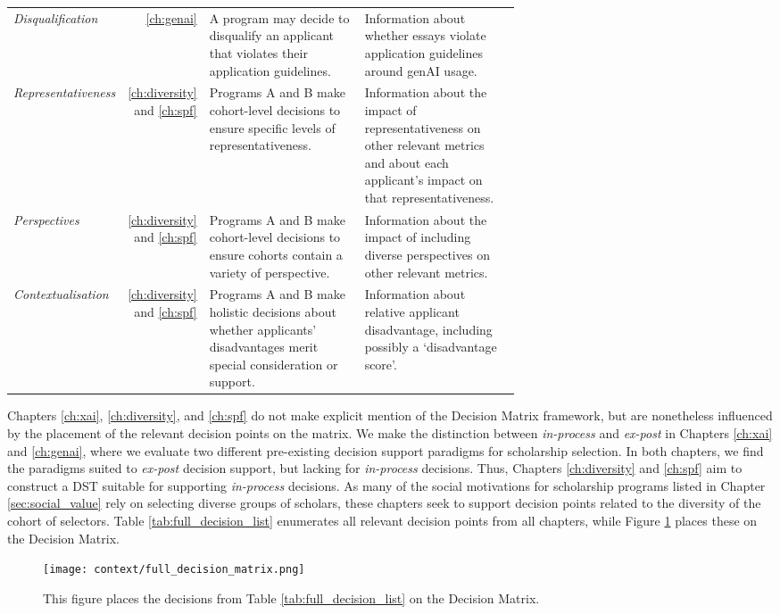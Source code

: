 \begin{table}[htbp]
\begin{tabular}{l r p{0.33\linewidth}p{0.33\linewidth}}
      \emph{Disqualification} & \ref{ch:genai} & A program may decide to disqualify an applicant that violates their application guidelines. & Information about whether essays violate application guidelines around genAI usage. \\
      \emph{Representativeness} & \ref{ch:diversity} and \ref{ch:spf} & Programs A and B make cohort-level decisions to ensure specific levels of representativeness. & Information about the impact of representativeness on other relevant metrics and about each applicant's impact on that representativeness. \\
      \emph{Perspectives} & \ref{ch:diversity} and \ref{ch:spf} & Programs A and B make cohort-level decisions to ensure cohorts contain a variety of perspective. & Information about the impact of including diverse perspectives on other relevant metrics. \\
      \emph{Contextualisation} & \ref{ch:diversity} and \ref{ch:spf} & Programs A and B make holistic decisions about whether applicants' disadvantages merit special consideration or support. & Information about relative applicant disadvantage, including possibly a `disadvantage score'. \\
      \bottomrule
  \end{tabular}
\end{table}

Chapters \ref{ch:xai}, \ref{ch:diversity}, and \ref{ch:spf} do not make explicit mention of the Decision Matrix framework, but are nonetheless influenced by the placement of the relevant decision points on the matrix. We make the distinction between \emph{in-process} and \emph{ex-post} in Chapters \ref{ch:xai} and \ref{ch:genai}, where we evaluate two different pre-existing decision support paradigms for scholarship selection. In both chapters, we find the paradigms suited to \emph{ex-post} decision support, but lacking for \emph{in-process} decisions. Thus, Chapters \ref{ch:diversity} and \ref{ch:spf} aim to construct a DST suitable for supporting \emph{in-process} decisions. As many of the social motivations for scholarship programs listed in Chapter \ref{sec:social_value} rely on selecting diverse groups of scholars, these chapters seek to support decision points related to the diversity of the cohort of selectors. Table \ref{tab:full_decision_list} enumerates all relevant decision points from all chapters, while Figure \ref{fig:full_decision_matrix} places these on the Decision Matrix.

\begin{figure}[htbp]
  \centering
  \texttt{[image: context/full\_decision\_matrix.png]}
  \caption{This figure places the decisions from Table \ref{tab:full_decision_list} on the Decision Matrix.}
  \label{fig:full_decision_matrix}
\end{figure}

